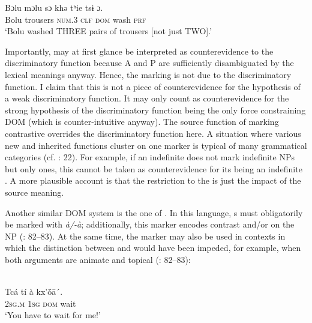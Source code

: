 \documentclass[output=paper]{langsci/langscibook}
\begin{document}
\ex\label{ex:serzant:27b}
\gll  Bɔlu   mɔlu     sɔ   khǝ   tʰie   tsɨ   ɔ.\\
     Bolu  trousers  \textsc{num.}3  \textsc{clf}  \textsc{dom}   wash   \textsc{prf}\\
\glt ‘Bolu washed THREE pairs of trousers [not just TWO].’
\z
\z

Importantly,  may at first glance be interpreted as counterevidence to the discriminatory function because A and P are sufficiently disambiguated by the lexical meanings anyway. Hence, the marking is not due to the discriminatory function. I claim that this is not a piece of counterevidence for the hypothesis of a weak discriminatory function. It may only count as counterevidence for the strong hypothesis of the discriminatory function being the only force constraining DOM (which is counter-intuitive anyway). The source function of marking contrastive  overrides the discriminatory function here. A situation where various new and inherited functions cluster on one marker is typical of many grammatical categories (cf. \citealt{Hopper1991}: 22). For example, if an indefinite  does not mark  indefinite NPs but only  ones, this cannot be taken as counterevidence for its being an indefinite . A more plausible account is that the restriction to the  is just the impact of the source meaning. 

Another similar DOM system is the one of . In this language, s must obligatorily be marked with \textit{à/-à}; additionally, this marker encodes contrast and/or  on the NP (\citealt{KilianHatz2006}: 82–83). At the same time, the marker may also be used in contexts in which the distinction between  and  would have been impeded, for example, when both arguments are animate and topical (\citealt{KilianHatz2006}: 82–83):

\ea 
{}\\
\ea
\gll  Tcá   tí   à   kx’ṓā´.\\
     \textsc{2sg.m}   \textsc{1sg}   \textsc{dom}  wait\\
\glt ‘You have to wait for me!’
\end{document}
